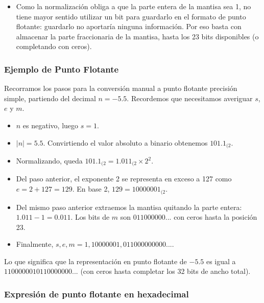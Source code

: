 \documentclass[spanish,A4,]{article}
\begin{document}
\begin{enumerate}
  \begin{itemize}
  \itemsep1pt\parskip0pt
  \item
    Como la normalización obliga a que la parte entera de la mantisa sea
    1, no tiene mayor sentido utilizar un bit para guardarlo en el
    formato de punto flotante: guardarlo no aportaría ninguna
    información. Por eso basta con almacenar la parte fraccionaria de la
    mantisa, hasta los 23 bits disponibles (o completando con ceros).
  \end{itemize}
\end{enumerate}

\subsubsection{Ejemplo de Punto
Flotante}\label{ejemplo-de-punto-flotante}

Recorramos los pasos para la conversión manual a punto flotante
precisión simple, partiendo del decimal $n = -5.5$. Recordemos que
necesitamos averiguar $s$, $e$ y $m$.

\begin{itemize}
\itemsep1pt\parskip0pt
\item
  $n$ es negativo, luego $s = 1$.
\item
  $|n| = 5.5$. Convirtiendo el valor absoluto a binario obtenemos
  $101.1_{(2}$.
\item
  Normalizando, queda $101.1_{(2} = 1.011_{(2}\times 2^2$.
\item
  Del paso anterior, el exponente 2 se representa en exceso a 127 como
  $e = 2 + 127 = 129$. En base 2, $129 = 10000001_{(2}$.
\item
  Del mismo paso anterior extraemos la mantisa quitando la parte entera:
  $1.011 - 1 = 0.011$. Los bits de $m$ son $011000000...$ con ceros
  hasta la posición 23.
\item
  Finalmente, $s, e, m = 1, 10000001, 011000000000...$.
\end{itemize}

Lo que significa que la representación en punto flotante de $-5.5$ es
igual a $1100000010110000000...$ (con ceros hasta completar los 32 bits
de ancho total).

\subsubsection{Expresión de punto flotante en
hexadecimal}\label{expresiuxf3n-de-punto-flotante-en-hexadecimal}
\end{document}
